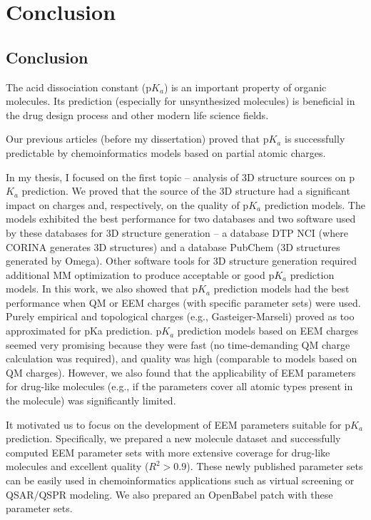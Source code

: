 \part{Conclusion}

\chapter{Conclusion}

The acid dissociation constant (p$K_a$) is an important property of organic
molecules. Its prediction (especially for unsynthesized molecules) is beneficial
in the drug design process and other modern life science fields.

Our previous articles \cite{Svobodova2011, Svobodova2013} (before my
dissertation) proved that p$K_a$ is successfully predictable by
chemoinformatics models based on partial atomic charges.

In my thesis, I focused on the first topic -- analysis of 3D structure sources
on p$K_a$ prediction. We proved that the source of the 3D structure had
a significant impact on charges and, respectively, on the quality of p$K_a$
prediction models. The models exhibited the best performance for two databases
and two software used by these databases for 3D structure generation -- 
a database DTP NCI (where CORINA generates 3D structures) and a database
PubChem (3D structures generated by Omega). Other software tools for 3D
structure generation required additional MM optimization to produce acceptable
or good p$K_a$ prediction models. In this work, we also showed that p$K_a$
prediction models had the best performance when QM or EEM charges (with specific
parameter sets) were used. Purely empirical and topological charges (e.g.,
Gasteiger-Marseli) proved as too approximated for pKa prediction. p$K_a$
prediction models based on EEM charges seemed very promising because they were
fast (no time-demanding QM charge calculation was required), and quality was
high (comparable to models based on QM charges). However, we also found that
the applicability of EEM parameters for drug-like molecules (e.g., if the
parameters cover all atomic types present in the molecule) was significantly
limited. 

It motivated us to focus on the development of EEM parameters suitable 
for p$K_a$ prediction. Specifically, we prepared a new molecule dataset and
successfully computed EEM parameter sets with more extensive coverage
for drug-like molecules and excellent quality ($R^2 > 0.9$). These newly published
parameter sets can be easily used in chemoinformatics applications
such as virtual screening or QSAR/QSPR modeling. We also prepared an OpenBabel
patch with these parameter sets.

